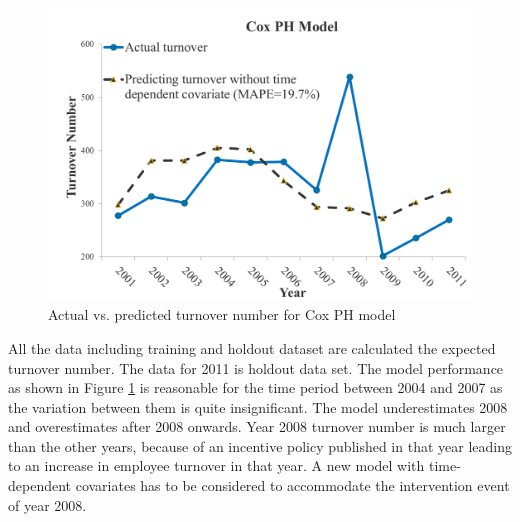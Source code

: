 \begin{figure}[htbp]
	\centering
	\includegraphics[width=5.5in]{Fig8.png}
	\caption{Actual vs. predicted turnover number for Cox PH model}
	\label{fig:8}
\end{figure}
All the data including training and holdout dataset are calculated the expected turnover number. The data for 2011 is holdout data set. The model performance as shown in Figure \ref{fig:8} is reasonable for the time period between 2004 and 2007 as the variation between them is quite insignificant. The model underestimates 2008 and overestimates after 2008 onwards. Year 2008 turnover number is much larger than the other years, because of an incentive policy published in that year leading to an increase in employee turnover in that year.  A new model with time-dependent covariates  has to be considered to accommodate the intervention event of year 2008.
